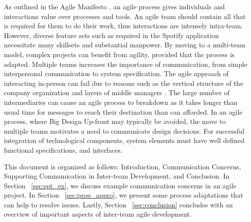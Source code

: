 As outlined in the Agile Manifesto \cite{beck2001agile}, an agile process gives individuals and interactions value over processes and tools.
An agile team should contain all that is required for them to do their work, thus interactions are intensely intra-team.
However, diverse feature sets such as required in the Spotify application necessitate many skillsets and substantial manpower.
By moving to a multi-team model, complex projects can benefit from agility, provided that the process is adapted.
Multiple teams increases the importance of communication, from simple interpersonal communication to system specification. 
The agile approach of interacting in-person can fail due to reasons such as the vertical structure of the company organization and layers of middle managers \cite{dzone_article}.
The large number of intermediaries can cause an agile process to breakdown as it takes longer than usual time for messages to reach their destination than can afforded.
In an agile process, where Big Design Up-front may typically be avoided, the move to multiple teams motivates a need to communicate design decisions.
For successful integration of technological components, system elements must have well defined functional specifications, and interfaces.


This document is organized as follows: Introduction, Communication Concerns, Supporting Communication in Inter-team Development, and Conclusion. 
In Section ~\ref{sec:spt_ex}, we discuss example communication concerns in an agile project.
In Section ~\ref{sec:prop_appro}, we present some process adaptations that can help to resolve issues.
Lastly, Section ~\ref{sec:conclusion} concludes with an overview of important aspects of inter-team agile development.



